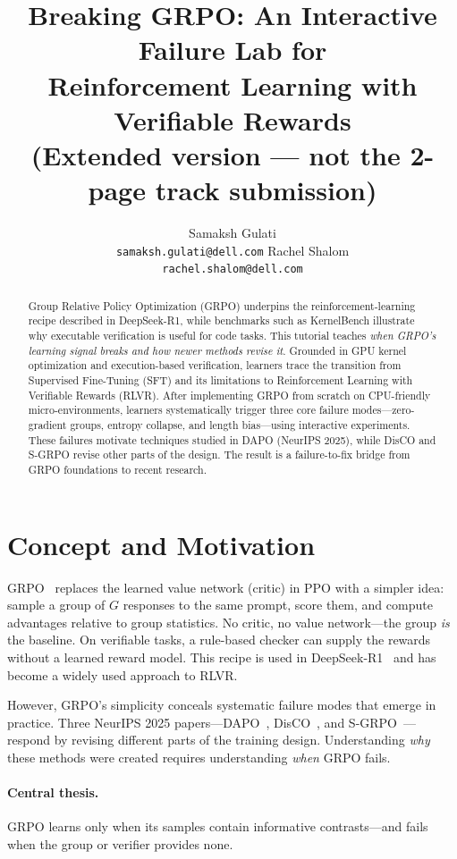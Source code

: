 \documentclass{article}
\title{Breaking GRPO: An Interactive Failure Lab for\\Reinforcement Learning with Verifiable Rewards\\[0.4em]
\large\normalfont(Extended version --- not the 2-page track submission)}
\author{
  Samaksh Gulati \\
  \texttt{samaksh.gulati@dell.com}
  \And
  Rachel Shalom \\
  \texttt{rachel.shalom@dell.com}
}
\begin{document}
\maketitle

\begin{abstract}
Group Relative Policy Optimization (GRPO) underpins the reinforcement-learning recipe described in DeepSeek-R1, while benchmarks such as KernelBench illustrate why executable verification is useful for code tasks. This tutorial teaches \emph{when GRPO's learning signal breaks and how newer methods revise it}. Grounded in GPU kernel optimization and execution-based verification, learners trace the transition from Supervised Fine-Tuning (SFT) and its limitations to Reinforcement Learning with Verifiable Rewards (RLVR). After implementing GRPO from scratch on CPU-friendly micro-environments, learners systematically trigger three core failure modes---zero-gradient groups, entropy collapse, and length bias---using interactive experiments. These failures motivate techniques studied in DAPO (NeurIPS 2025), while DisCO and S-GRPO revise other parts of the design. The result is a failure-to-fix bridge from GRPO foundations to recent research.
\end{abstract}

\section{Concept and Motivation}

GRPO~\cite{deepseekmath} replaces the learned value network (critic) in PPO with a simpler idea: sample a group of $G$ responses to the same prompt, score them, and compute advantages relative to group statistics. No critic, no value network---the group \emph{is} the baseline. On verifiable tasks, a rule-based checker can supply the rewards without a learned reward model. This recipe is used in DeepSeek-R1~\cite{deepseekr1} and has become a widely used approach to RLVR.

However, GRPO's simplicity conceals systematic failure modes that emerge in practice. Three NeurIPS 2025 papers---DAPO~\cite{dapo}, DisCO~\cite{disco}, and S-GRPO~\cite{sgrpo}---respond by revising different parts of the training design. Understanding \emph{why} these methods were created requires understanding \emph{when} GRPO fails.

\paragraph{Central thesis.} GRPO learns only when its samples contain informative contrasts---and fails when the group or verifier provides none.
\end{document}
